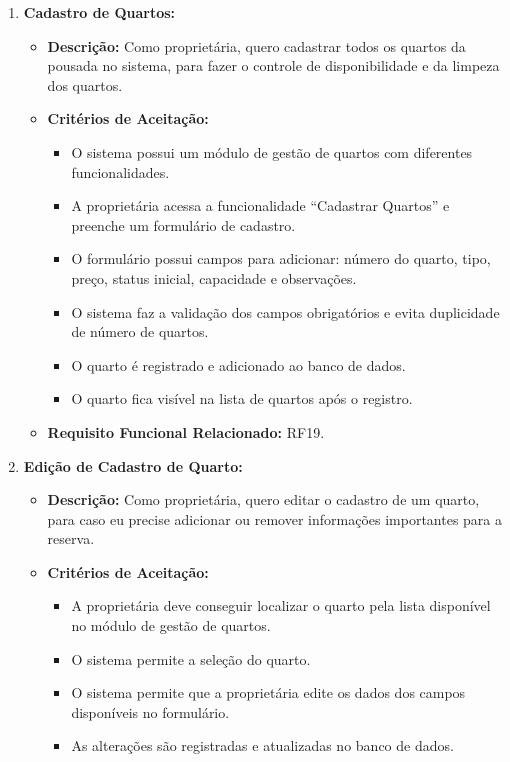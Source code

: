 \documentclass[
	12pt,				%
	openany,			%
	twoside,			%
	a4paper,			%
	english,			%
	french,				%
	spanish,			%
	brazil				%
	]{abntex2}
\begin{document}
\begin{enumerate}[label=\textbf{\arabic*.}]
\begin{itemize}
	 \end{itemize} 
	  \item \textbf{Cadastro de Quartos:}
	 \begin{itemize}
	 	\item \textbf{Descrição:} Como proprietária, quero cadastrar todos os quartos da pousada no sistema, para fazer o controle de disponibilidade e da limpeza dos quartos.
	 	\item \textbf{Critérios de Aceitação:}
	 	\begin{itemize}
	 		\item O sistema possui um módulo de gestão de quartos com diferentes funcionalidades.
	 		\item A proprietária acessa a funcionalidade “Cadastrar Quartos” e preenche um formulário de cadastro.
	 		\item O formulário possui campos para adicionar: número do quarto, tipo, preço, status inicial, capacidade e observações.
	 		\item O sistema faz a validação dos campos obrigatórios e evita duplicidade de número de quartos.
	 		\item O quarto é registrado e adicionado ao banco de dados.
	 		\item O quarto fica visível na lista de quartos após o registro.
	 	\end{itemize}
	 	\item \textbf{Requisito Funcional Relacionado:} RF19.
	 \end{itemize} 
	  \item \textbf{Edição de Cadastro de Quarto:}
	 \begin{itemize}
	 	\item \textbf{Descrição:} Como proprietária, quero editar o cadastro de um quarto, para caso eu precise adicionar ou remover informações importantes para a reserva.
	 	\item \textbf{Critérios de Aceitação:}
	 	\begin{itemize}
	 		\item A proprietária deve conseguir localizar o quarto pela lista disponível no módulo de gestão de quartos.
	 		\item O sistema permite a seleção do quarto.
	 		\item O sistema permite que a proprietária edite os dados dos campos disponíveis no formulário.
	 		\item As alterações são registradas e atualizadas no banco de dados.
	 	\end{itemize}

\end{itemize}
\end{enumerate}
\end{document}
